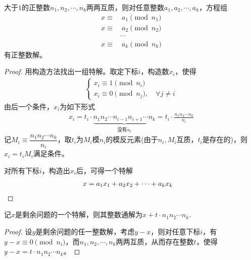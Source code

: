 \begin{theorem}
  大于$1$的正整数$n_1,n_2,\cdots, n_k$两两互质，则对任意整数$a_1,a_2,\cdots,a_k$，方程组
  \begin{align*}
    x\equiv&\ a_1\pmod{n_1}\\
    x\equiv&\ a_2\pmod{n_2}\\
    &\cdots\\
    x\equiv&\ a_k\pmod{n_k}
  \end{align*}
  有正整数解。  
\end{theorem}
\begin{proof}
  用构造方法找出一组特解。取定下标$i$，构造数$x_i$，使得
  \begin{align*}
    \begin{cases}
      x_i\equiv1\pmod{n_i}\\
      x_i\equiv0\pmod{n_j}, \quad\forall j\ne i
    \end{cases}
  \end{align*}
  由后一个条件，$x_i$为如下形式
  \begin{align*}
    x_i=t_i\cdot \underbrace{n_1n_2\cdots n_{i-1}n_{i+1}\cdots n_k}_{\text{没有}n_i}=t_i\cdot \frac{n_1n_2 \cdots n_k}{n_i}
  \end{align*}
  记$M_i\equiv\dfrac{n_1n_2\cdots n_k}{n_i}$，取$t_i$为$M_i$模$n_i$的模反元素(由于$n_i,M_i$互质，$t_i$是存在的)，则$x_i=t_iM_i$满足条件。

  对所有下标$i$，构造出$x_i$后，可得一个特解
  \begin{align*}
    x=a_1x_1+a_2x_2+\cdots+a_kx_k&\qedhere
  \end{align*}
\end{proof}

\begin{theorem}
  记$x$是剩余问题的一个特解，则其整数通解为$x+t\cdot n_1n_2\cdots n_k$.
\end{theorem}
\begin{proof}
  设$y$是剩余问题的任一整数解，考虑$y-x$，则对任意下标$i$，有$y-x\equiv0\pmod{n_i}$，而$n_1,n_2,\cdots,n_k$两两互质，从而存在整数$t$，使得$y-x=t\cdot n_1n_2\cdots n_k$。
\end{proof}

